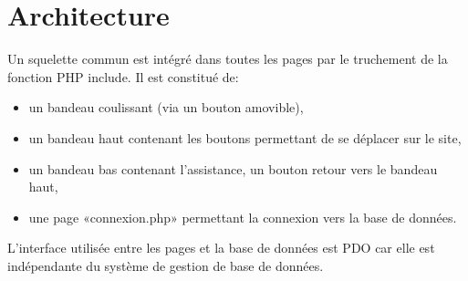 \documentclass[12pt]{report}
\begin{document}
        \chapter{Architecture}
        \par             
	    Un squelette commun est intégré dans toutes les pages par le truchement de la fonction PHP include. Il  est constitué de:
	    \begin{itemize}
        \item{un bandeau coulissant (via un bouton amovible),}
        \item{un bandeau haut contenant les boutons permettant de se déplacer sur le site,}
        \item{ un bandeau bas contenant l’assistance, un bouton retour vers le bandeau haut,}
        \item{une page «connexion.php» permettant la connexion vers la base de données.}
        \end{itemize}
       L’interface utilisée entre les pages et la base de données est PDO car elle est indépendante du système de gestion de base de données.   
        \bigskip
       
\end{document}
